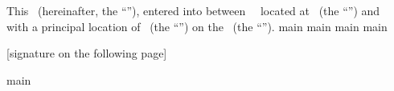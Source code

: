 This \amendmentTitle\ (hereinafter, the “\amendmentTitle”), entered into between \lessorName\, \lessorType\, located at \lessorAddress\ (the “\lessor”) and \lesseeName\, \lesseeType\, with a principal location of \lesseeAddress\ (the “\lessee”) on the \effectiveDateText\ (the “\effectiveDate”).
\newline
{main}
\newline
{main}
\newline
{main}
\newline
{main}
\newpage
\begin{center}
[signature on the following page]
\end{center}
\newpage
{main}
